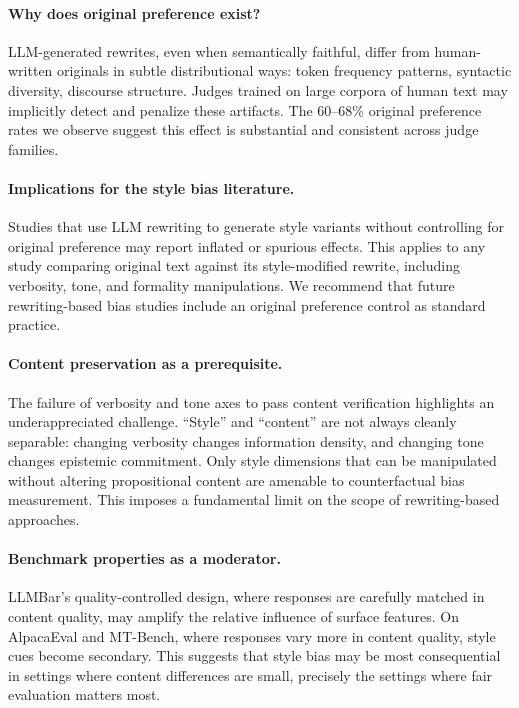 \documentclass[11pt,a4paper]{article}
\begin{document}
\paragraph{Why does original preference exist?}
LLM-generated rewrites, even when semantically faithful, differ from human-written originals in subtle distributional ways: token frequency patterns, syntactic diversity, discourse structure.
Judges trained on large corpora of human text may implicitly detect and penalize these artifacts.
The 60--68\% original preference rates we observe suggest this effect is substantial and consistent across judge families.

\paragraph{Implications for the style bias literature.}
Studies that use LLM rewriting to generate style variants without controlling for original preference may report inflated or spurious effects.
This applies to any study comparing original text against its style-modified rewrite, including verbosity, tone, and formality manipulations.
We recommend that future rewriting-based bias studies include an original preference control as standard practice.

\paragraph{Content preservation as a prerequisite.}
The failure of verbosity and tone axes to pass content verification highlights an underappreciated challenge.
``Style'' and ``content'' are not always cleanly separable: changing verbosity changes information density, and changing tone changes epistemic commitment.
Only style dimensions that can be manipulated without altering propositional content are amenable to counterfactual bias measurement.
This imposes a fundamental limit on the scope of rewriting-based approaches.

\paragraph{Benchmark properties as a moderator.}
LLMBar's quality-controlled design, where responses are carefully matched in content quality, may amplify the relative influence of surface features.
On AlpacaEval and MT-Bench, where responses vary more in content quality, style cues become secondary.
This suggests that style bias may be most consequential in settings where content differences are small, precisely the settings where fair evaluation matters most.
\end{document}
